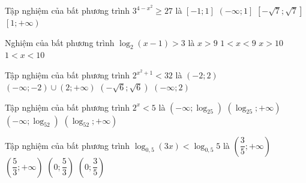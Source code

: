 \begin{ex}%
	Tập nghiệm của bất phương  trình $3^{4-x^2}\ge 27$ là
	 \choice
		{\True \True $\left[-  1; 1\right]$}
		 {$\left(- \infty; 1\right]$}
		 {$\left[- \sqrt{7}; \sqrt{7}\right]$}
		 {$\left[1;+\infty\right)$}
\end{ex}

\begin{ex}%
	Nghiệm của  bất phương trình $\log_2(x-1)>3$ là
	\choice 
		 {\True $x>9$}
		{$1<x<9$} 
		 {$x>10$}
		{$1<x<10$} 
\end{ex}

\begin{ex}%
	Tập  nghiệm của bất phương trình $2^{x^2+1}<32$ là
	 \choice
		{\True  $\left(-2;2\right)$}
		{$\left(-\infty;-2\right)\cup \left(2;+\infty\right)$} 
		 {$\left(-\sqrt{6};\sqrt{6}\right)$}
		 {$\left(-\infty;2\right)$}
\end{ex}

\begin{ex}%
	Tập nghiệm của bất phương  trình $2^x<5$ là
	 \choice
		{\True $(-\infty;\log_25)$} 
		 {$(\log_25;+\infty)$}
		 {$(-\infty;\log_52)$}
		 {$(\log_52;+\infty)$}
\end{ex}

\begin{ex}%
	Tập nghiệm của  bất phương trình $\log_{0{,}5}(3x)<\log_{0{,}5}5$ là
	\choice 
		{$\left(\dfrac{3}{5};+\infty\right)$} 
		{\True  $\left(\dfrac{5}{3};+\infty\right)$}
		 {$\left(0;\dfrac{5}{3}\right)$}
		 {$\left(0;\dfrac{3}{5}\right)$}
\end{ex}

